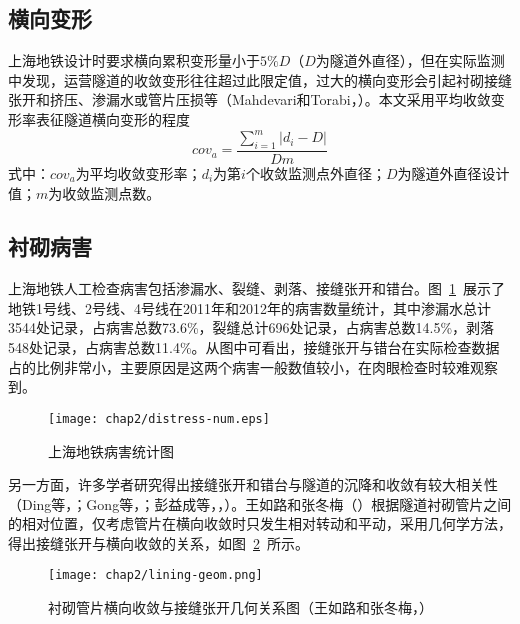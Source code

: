 \subsection{横向变形}

上海地铁设计时要求横向累积变形量小于$5\%D$（$D$为隧道外直径），但在实际监测中发现，运营隧道的收敛变形往往超过此限定值，过大的横向变形会引起衬砌接缝张开和挤压、渗漏水或管片压损等（Mahdevari和Torabi，\citeyear{mahdevari2012prediction}）。本文采用平均收敛变形率表征隧道横向变形的程度
\begin{equation}
    \label{equ:conv_ave}
    {{cov}_{a}}=\frac{\sum\limits_{i=1}^{m}{\left| {{d}_{i}}-D \right|}}{Dm}
\end{equation}
式中：${cov}_{a}$为平均收敛变形率；${d}_{i}$为第$i$个收敛监测点外直径；$D$为隧道外直径设计值；$m$为收敛监测点数。

\subsection{衬砌病害}

上海地铁人工检查病害包括渗漏水、裂缝、剥落、接缝张开和错台。图~\ref{fig:上海地铁病害统计图}~展示了地铁1号线、2号线、4号线在2011年和2012年的病害数量统计，其中渗漏水总计3544处记录，占病害总数73.6\%，裂缝总计696处记录，占病害总数14.5\%，剥落548处记录，占病害总数11.4\%。从图中可看出，接缝张开与错台在实际检查数据占的比例非常小，主要原因是这两个病害一般数值较小，在肉眼检查时较难观察到。

\begin{figure}[htbp]
    \centering
    \texttt{[image: chap2/distress-num.eps]}
    \caption{上海地铁病害统计图}
    \label{fig:上海地铁病害统计图}
\end{figure}

另一方面，许多学者研究得出接缝张开和错台与隧道的沉降和收敛有较大相关性（Ding等，\citeyear{ding2013full}；Gong等，\citeyear{gong2017comparison}；彭益成等，\citeyear{彭益成2013盾构隧道衬砌结构的壳}，）。王如路和张冬梅（\citeyear{王如路2013超载作用下软土盾构隧道横向变形机理及控制指标研究}）根据隧道衬砌管片之间的相对位置，仅考虑管片在横向收敛时只发生相对转动和平动，采用几何学方法，得出接缝张开与横向收敛的关系，如图~\ref{fig:衬砌管片横向收敛与接缝张开几何关系图}~所示。

\begin{figure}[htbp]
    \centering
    \texttt{[image: chap2/lining-geom.png]}
    \caption{衬砌管片横向收敛与接缝张开几何关系图（王如路和张冬梅，\citeyear{王如路2013超载作用下软土盾构隧道横向变形机理及控制指标研究}）}
    \label{fig:衬砌管片横向收敛与接缝张开几何关系图}
\end{figure}

